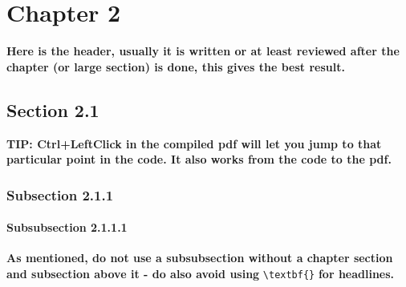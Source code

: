 \chapter{Chapter 2}
\textbf{Here is the header, usually it is written or at least reviewed after the chapter (or large section) is done, this gives the best result.}

\lipsum[8]
\section{Section 2.1} %
\lipsum[2]
\textbf{TIP: Ctrl+LeftClick in the compiled pdf will let you jump to that particular point in the code. It also works from the code to the pdf.}
\subsection{Subsection 2.1.1}
\lipsum[5]
\subsubsection{Subsubsection 2.1.1.1}
\textbf{As mentioned, do not use a subsubsection without a chapter section and subsection above it - do also avoid using} \verb|\textbf{}| \textbf{for headlines.}\\